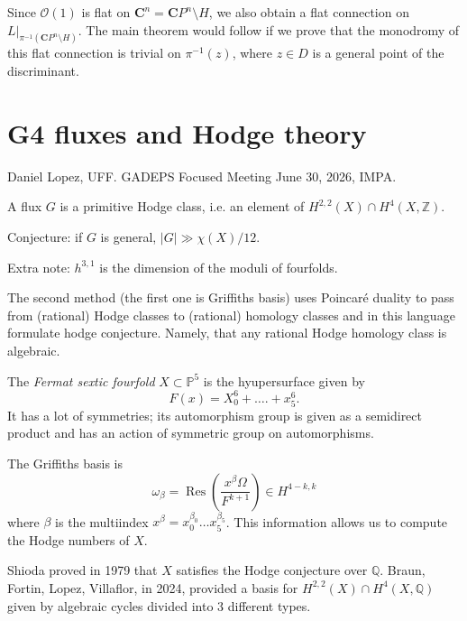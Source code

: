 \begin{remark}
\label{remark-flat-connection}
Since \(\mathcal{O}(1)\) is flat on
\(\mathbf{C}^n = \mathbf{C}P^n \setminus H\),
we also obtain a flat connection on
\(L|_{\pi^{-1}(\mathbf{C}P^n\setminus H)}\).
The main theorem would follow if we prove
that the monodromy of this flat connection is
trivial on \(\pi^{-1}(z)\), where
\(z \in D\) is a general point of the
discriminant.
\end{remark}

\section{G4 fluxes and Hodge theory}
\label{section-g4-fluxes-and-hodge-theory}

\noindent
Daniel Lopez, UFF.
GADEPS Focused Meeting June 30, 2026, IMPA.

\medskip\noindent
A flux $G$ is a primitive Hodge class,
i.e. an element of $H^{2,2}(X)
\cap H^4(X,\mathbb{Z})$.

\medskip\noindent
Conjecture: if $G$ is general,
 $|G|\gg \chi(X)/12$.

\medskip\noindent
Extra note:
$h^{3,1}$ is the dimension of the moduli
of fourfolds.

\noindent
The second method (the first
one is Griffiths basis)
uses Poincaré duality to pass
from (rational) Hodge classes
to (rational) homology classes and in
this language formulate hodge conjecture.
Namely, that any rational Hodge homology
class is algebraic.

\begin{example}
\label{example-fermat-sextic}
The {\it Fermat sextic fourfold} 
$X \subset \mathbb{P}^5$ is the hyupersurface
given by
$$
F(x) = X_0^6+….+x_5^6.
$$
It has a lot of symmetries;
its automorphism group
is given as a semidirect product
and has an action
of symmetric group on automorphisms.

The Griffiths basis is
$$
\omega_\beta=
\operatorname{Res}
\left(\frac{x^\beta \Omega}{F^{k+1}}\right)
\in H^{4-k,k}
$$
where $\beta$ is the multiindex
$x^\beta= x_0^{\beta_0}…x_5^{\beta_5}$.
This information allows us to compute
the Hodge numbers of $X$.

Shioda proved in 1979 that $X$ satisfies
the Hodge conjecture over $\mathbb{Q}$.
Braun, Fortin, Lopez, Villaflor, in 2024,
provided a basis for $H^{2,2}(X) \cap
H^4(X,\mathbb{Q})$ given by algebraic cycles
divided into 3 different types.
\end{example}

